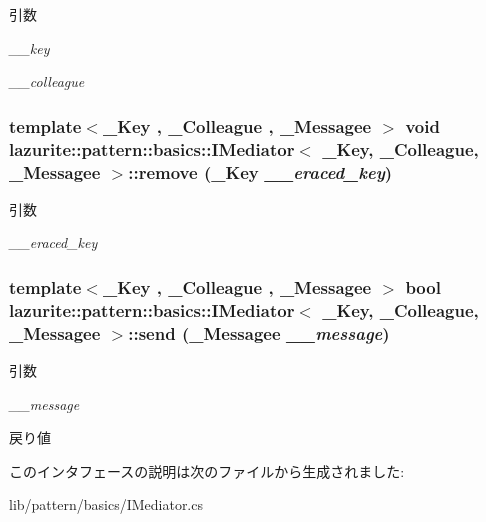 \begin{DoxyParams}{引数}
\item[{\em \_\-\_\-key}]\item[{\em \_\-\_\-colleague}]\end{DoxyParams}
\hypertarget{interfacelazurite_1_1pattern_1_1basics_1_1_i_mediator_3_01___key_00_01___colleague_00_01___messagee_01_4_aa01f948777b7760509569a435e1194cb}{
\subsubsection[{remove}]{\setlength{\rightskip}{0pt plus 5cm}template$<$\_\-Key , \_\-Colleague , \_\-Messagee $>$ void lazurite::pattern::basics::IMediator$<$ \_\-Key, \_\-Colleague, \_\-Messagee $>$::remove (\_\-Key {\em \_\-\_\-eraced\_\-key})}}
\label{interfacelazurite_1_1pattern_1_1basics_1_1_i_mediator_3_01___key_00_01___colleague_00_01___messagee_01_4_aa01f948777b7760509569a435e1194cb}

\begin{DoxyParams}{引数}
\item[{\em \_\-\_\-eraced\_\-key}]\end{DoxyParams}
\hypertarget{interfacelazurite_1_1pattern_1_1basics_1_1_i_mediator_3_01___key_00_01___colleague_00_01___messagee_01_4_afa531f2cede26ca58e499c83edf7ffdb}{
\subsubsection[{send}]{\setlength{\rightskip}{0pt plus 5cm}template$<$\_\-Key , \_\-Colleague , \_\-Messagee $>$ bool lazurite::pattern::basics::IMediator$<$ \_\-Key, \_\-Colleague, \_\-Messagee $>$::send (\_\-Messagee {\em \_\-\_\-message})}}
\label{interfacelazurite_1_1pattern_1_1basics_1_1_i_mediator_3_01___key_00_01___colleague_00_01___messagee_01_4_afa531f2cede26ca58e499c83edf7ffdb}

\begin{DoxyParams}{引数}
\item[{\em \_\-\_\-message}]\end{DoxyParams}
\begin{DoxyReturn}{戻り値}

\end{DoxyReturn}


このインタフェースの説明は次のファイルから生成されました:\begin{DoxyCompactItemize}
\item 
lib/pattern/basics/IMediator.cs\end{DoxyCompactItemize}
